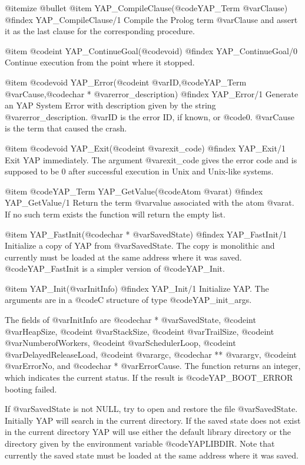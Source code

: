@itemize @bullet
@item  YAP_CompileClause(@code{YAP_Term} @var{Clause})
@findex  YAP_CompileClause/1
Compile the Prolog term @var{Clause} and assert it as the last clause
for the corresponding procedure.

@item  @code{int} YAP_ContinueGoal(@code{void})
@findex YAP_ContinueGoal/0
Continue execution from the point where it stopped.

@item  @code{void} YAP_Error(@code{int} @var{ID},@code{YAP_Term} @var{Cause},@code{char *} @var{error_description})
@findex YAP_Error/1
Generate an YAP System Error with description given by the string
@var{error_description}. @var{ID} is the error ID, if known, or
@code{0}. @var{Cause} is the term that caused the crash.

@item  @code{void} YAP_Exit(@code{int} @var{exit_code})
@findex YAP_Exit/1
Exit YAP immediately. The argument @var{exit_code} gives the error code
and is supposed to be 0 after successful execution in Unix and Unix-like
systems.

@item  @code{YAP_Term} YAP_GetValue(@code{Atom} @var{at})
@findex  YAP_GetValue/1
Return the term @var{value} associated with the atom @var{at}. If no
such term exists the function will return the empty list.

@item  YAP_FastInit(@code{char *} @var{SavedState})
@findex  YAP_FastInit/1
Initialize a copy of YAP from @var{SavedState}. The copy is
monolithic and currently must be loaded at the same address where it was
saved. @code{YAP_FastInit} is a simpler version of @code{YAP_Init}.

@item  YAP_Init(@var{InitInfo})
@findex  YAP_Init/1
Initialize YAP. The arguments are in a @code{C}
structure of type @code{YAP_init_args}.

The fields of @var{InitInfo} are @code{char *} @var{SavedState},
@code{int} @var{HeapSize}, @code{int} @var{StackSize}, @code{int}
@var{TrailSize}, @code{int} @var{NumberofWorkers}, @code{int}
@var{SchedulerLoop}, @code{int} @var{DelayedReleaseLoad}, @code{int}
@var{argc}, @code{char **} @var{argv}, @code{int} @var{ErrorNo}, and
@code{char *} @var{ErrorCause}. The function returns an integer, which
indicates the current status. If the result is @code{YAP_BOOT_ERROR}
booting failed.

If @var{SavedState} is not NULL, try to open and restore the file
@var{SavedState}. Initially YAP will search in the current directory. If
the saved state does not exist in the current directory YAP will use
either the default library directory or the directory given by the
environment variable @code{YAPLIBDIR}. Note that currently
the saved state must be loaded at the same address where it was saved.

